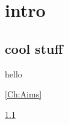 \chapter{intro}
\label{things}


\section{cool stuff}
\label{sectioncoolstuff}

hello

\ref{Ch:Aims}

\ref*{sectioncoolstuff}